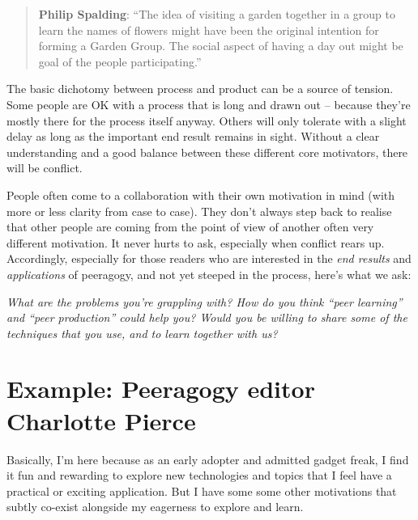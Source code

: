 \begin{quote}
\textbf{Philip Spalding}: ``The idea of visiting a garden together in
a group to learn the names of flowers might have been the original
intention for forming a Garden Group. The social aspect of having a
day out might be goal of the people participating.''
\end{quote}

The basic dichotomy between process and product can be a source of
tension.  Some people are OK with a process that is long and drawn out
-- because they’re mostly there for the process itself anyway.  Others
will only tolerate with a slight delay as long as the important end
result remains in sight.  Without a clear understanding and a good
balance between these different core motivators, there will be
conflict.

People often come to a collaboration with their own motivation in mind
(with more or less clarity from case to case).  They don’t always step
back to realise that other people are coming from the point of view of
another often very different motivation.  It never hurts to ask,
especially when conflict rears up.  Accordingly, especially for those
readers who are interested in the \emph{end results} and
\emph{applications} of peeragogy, and not yet steeped in the process,
here's what we ask:

\begin{mdframed}
\emph{What are the problems you're grappling with?  How do you think
  ``peer learning'' and ``peer production'' could help you?  Would you
  be willing to share some of the techniques that you use, and to
  learn together with us?}
\end{mdframed}






\section*{Example: Peeragogy editor Charlotte Pierce}

Basically, I'm here because as an early adopter and admitted gadget
freak, I find it fun and rewarding to explore new technologies and
topics that I feel have a practical or exciting application. But I have
some some other motivations that subtly co-exist alongside my eagerness
to explore and learn.

